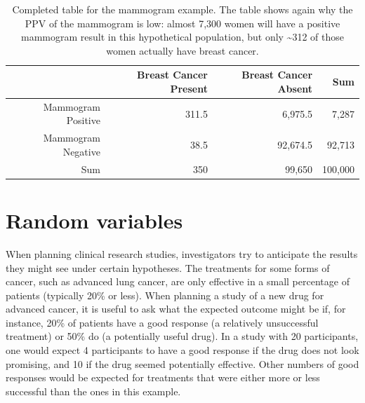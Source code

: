 \begin{table}[ht]
	\centering
	\begin{tabular}{rrrr}
		\hline
		& Breast Cancer Present & Breast Cancer Absent & Sum \\ 
		\hline
		Mammogram Positive & 311.5 & 6,975.5 & 7,287 \\ 
		Mammogram Negative &  38.5 & 92,674.5 & 92,713 \\ 
		Sum & 350 & 99,650 & 100,000 \\ 
		\hline
	\end{tabular}
	\caption{Completed table for the mammogram example. The table shows again why the PPV of the mammogram is low: almost 7,300 women will have a positive mammogram result in this hypothetical population, but only \textasciitilde312 of those women actually have breast cancer.}
	\label{tableMammogramExample}
\end{table}




%
% 




\textC{\newpage}



\section{Random variables}
\label{randomVariablesSection}


When planning clinical research studies, investigators try to anticipate the results they might see under certain hypotheses. The treatments for some forms of cancer, such as advanced lung cancer, are only effective in a small percentage of patients (typically 20\% or less). When planning a study of a new drug for advanced cancer, it is useful to ask what the expected outcome might be if, for instance, 20\% of patients have a good response (a relatively unsuccessful treatment) or 50\% do (a potentially useful drug).  In a study with 20 participants, one would expect 4 participants to have a good response if the drug does not look promising, and 10 if the drug seemed potentially effective. Other numbers of good responses would be expected for treatments that were either more or less successful than the ones in this example. 


